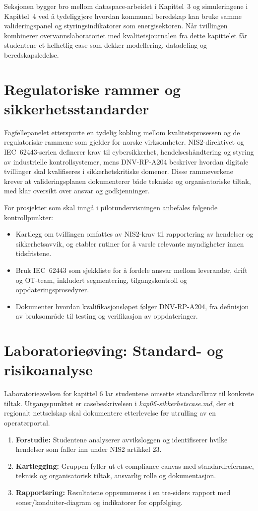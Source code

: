 Seksjonen bygger bro mellom dataspace-arbeidet i Kapittel~3 og simuleringene i Kapittel~4 ved å tydeliggjøre hvordan kommunal beredskap kan bruke samme valideringspanel og styringsindikatorer som energisektoren. Når tvillingen kombinerer overvannslaboratoriet med kvalitetsjournalen fra dette kapittelet får studentene et helhetlig case som dekker modellering, datadeling og beredskapsledelse.

\section{Regulatoriske rammer og sikkerhetsstandarder}
Fagfellepanelet etterspurte en tydelig kobling mellom kvalitetsprosessen og de regulatoriske rammene som gjelder for norske virksomheter. NIS2-direktivet og IEC~62443-serien definerer krav til cybersikkerhet, hendelseshåndtering og styring av industrielle kontrollsystemer, mens DNV-RP-A204 beskriver hvordan digitale tvillinger skal kvalifiseres i sikkerhetskritiske domener.\citep{eu2022nis2,iec62443-2-1,dnv2021a204} Disse rammeverkene krever at valideringsplanen dokumenterer både tekniske og organisatoriske tiltak, med klar oversikt over ansvar og godkjenninger.

For prosjekter som skal inngå i pilotundervisningen anbefales følgende kontrollpunkter:
\begin{itemize}
    \item Kartlegg om tvillingen omfattes av NIS2-krav til rapportering av hendelser og sikkerhetsavvik, og etabler rutiner for å varsle relevante myndigheter innen tidsfristene.
    \item Bruk IEC~62443 som sjekkliste for å fordele ansvar mellom leverandør, drift og OT-team, inkludert segmentering, tilgangskontroll og oppdateringsprosedyrer.
    \item Dokumenter hvordan kvalifikasjonsløpet følger DNV-RP-A204, fra definisjon av bruksområde til testing og verifikasjon av oppdateringer.
\end{itemize}
\section{Laboratorieøving: Standard- og risikoanalyse}
Laboratorieøvelsen for kapittel 6 lar studentene omsette standardkrav til konkrete tiltak. Utgangspunktet er casebeskrivelsen i \textit{kap06-sikkerhetscase.md}, der et regionalt nettselskap skal dokumentere etterlevelse før utrulling av en operatørportal.

\begin{enumerate}
    \item \textbf{Forstudie:} Studentene analyserer avviksloggen og identifiserer hvilke hendelser som faller inn under NIS2 artikkel 23.
    \item \textbf{Kartlegging:} Gruppen fyller ut et compliance-canvas med standardreferanse, teknisk og organisatorisk tiltak, ansvarlig rolle og dokumentasjon.
    \item \textbf{Rapportering:} Resultatene oppsummeres i en tre-siders rapport med soner/konduiter-diagram og indikatorer for oppfølging.
\end{enumerate}

